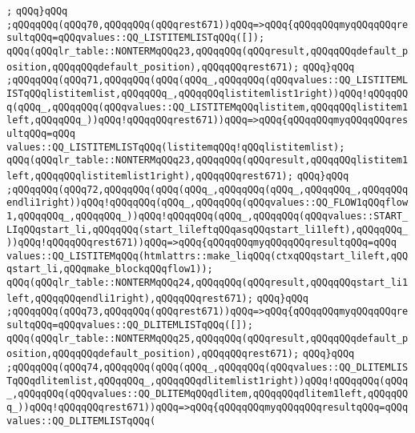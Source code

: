 \verb|;|\newline
\verb|qQQq}qQQq|\newline
\verb|;qQQqqQQq(qQQq70,qQQqqQQq(qQQqrest671))qQQq=>qQQq{qQQqqQQqmyqQQqqQQqresultqQQq=qQQqvalues::QQ_LISTITEMLISTqQQq([]);|\newline
\verb|qQQq(qQQqlr_table::NONTERMqQQq23,qQQqqQQq(qQQqresult,qQQqqQQqdefault_position,qQQqqQQqdefault_position),qQQqqQQqrest671);|\newline
\verb|qQQq}qQQq|\newline
\verb|;qQQqqQQq(qQQq71,qQQqqQQq(qQQq(qQQq_,qQQqqQQq(qQQqvalues::QQ_LISTITEMLISTqQQqlistitemlist,qQQqqQQq_,qQQqqQQqlistitemlist1right))qQQq!qQQqqQQq(qQQq_,qQQqqQQq(qQQqvalues::QQ_LISTITEMqQQqlistitem,qQQqqQQqlistitem1left,qQQqqQQq_))qQQq!qQQqqQQqrest671))qQQq=>qQQq{qQQqqQQqmyqQQqqQQqresultqQQq=qQQq|\newline
\verb|values::QQ_LISTITEMLISTqQQq(listitemqQQq!qQQqlistitemlist);|\newline
\verb|qQQq(qQQqlr_table::NONTERMqQQq23,qQQqqQQq(qQQqresult,qQQqqQQqlistitem1left,qQQqqQQqlistitemlist1right),qQQqqQQqrest671);|\newline
\verb|qQQq}qQQq|\newline
\verb|;qQQqqQQq(qQQq72,qQQqqQQq(qQQq(qQQq_,qQQqqQQq(qQQq_,qQQqqQQq_,qQQqqQQqendli1right))qQQq!qQQqqQQq(qQQq_,qQQqqQQq(qQQqvalues::QQ_FLOW1qQQqflow1,qQQqqQQq_,qQQqqQQq_))qQQq!qQQqqQQq(qQQq_,qQQqqQQq(qQQqvalues::START_LIqQQqstart_li,qQQqqQQq(start_lileftqQQqasqQQqstart_li1left),qQQqqQQq_))qQQq!qQQqqQQqrest671))qQQq=>qQQq{qQQqqQQqmyqQQqqQQqresultqQQq=qQQq|\newline
\verb|values::QQ_LISTITEMqQQq(htmlattrs::make_liqQQq(ctxqQQqstart_lileft,qQQqstart_li,qQQqmake_blockqQQqflow1));|\newline
\verb|qQQq(qQQqlr_table::NONTERMqQQq24,qQQqqQQq(qQQqresult,qQQqqQQqstart_li1left,qQQqqQQqendli1right),qQQqqQQqrest671);|\newline
\verb|qQQq}qQQq|\newline
\verb|;qQQqqQQq(qQQq73,qQQqqQQq(qQQqrest671))qQQq=>qQQq{qQQqqQQqmyqQQqqQQqresultqQQq=qQQqvalues::QQ_DLITEMLISTqQQq([]);|\newline
\verb|qQQq(qQQqlr_table::NONTERMqQQq25,qQQqqQQq(qQQqresult,qQQqqQQqdefault_position,qQQqqQQqdefault_position),qQQqqQQqrest671);|\newline
\verb|qQQq}qQQq|\newline
\verb|;qQQqqQQq(qQQq74,qQQqqQQq(qQQq(qQQq_,qQQqqQQq(qQQqvalues::QQ_DLITEMLISTqQQqdlitemlist,qQQqqQQq_,qQQqqQQqdlitemlist1right))qQQq!qQQqqQQq(qQQq_,qQQqqQQq(qQQqvalues::QQ_DLITEMqQQqdlitem,qQQqqQQqdlitem1left,qQQqqQQq_))qQQq!qQQqqQQqrest671))qQQq=>qQQq{qQQqqQQqmyqQQqqQQqresultqQQq=qQQqvalues::QQ_DLITEMLISTqQQq(|\newline
